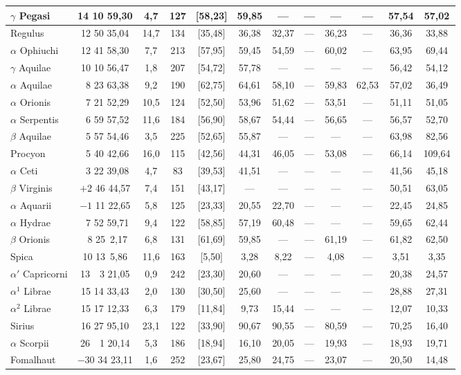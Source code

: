 \documentclass[12pt,a4paper]{article}
\theoremstyle{plain}
\theoremstyle{definition}
\theoremstyle{remark}
\begin{document}
{\begin{center}
\begin{tabular}{l|c c c | c c c c c c c c}
$\gamma$ Pegasi & 14 10 59,30 & 4,7 & 127 & [58,23] & 59,85 & --- & --- & --- & --- & 57,54 & 57,02 \\
\midrule
Regulus & 12 50 35,04 & 14,7 & 134 & [35,48] & 36,38 & 32,37 & --- & 36,23 & --- & 36,36 & 33,88 \\
$\alpha$ Ophiuchi & 12 41 58,30 & 7,7 & 213 & [57,95] & 59,45 & 54,59 & --- & 60,02 & --- & 63,95 & 69,44 \\
$\gamma$ Aquilae & 10 10 56,47 & 1,8 & 207 & [54,72] & 57,78 & --- & --- & --- & --- & 56,42 & 54,12 \\
$\alpha$ Aquilae & \ 8 23 63,38 & 9,2 & 190 & [62,75] & 64,61 & 58,10 & --- & 59,83 & 62,53 & 57,02 & 36,49 \\
$\alpha$ Orionis & \ 7 21 52,29 & 10,5 & 124 & [52,50] & 53,96 & 51,62 & --- & 53,51 & --- & 51,11 & 51,05 \\
\midrule
$\alpha$ Serpentis & \ 6 59 57,52 & 11,6 & 184 & [56,90] & 58,67 & 54,44 & --- & 56,65 & --- & 56,57 & 52,70 \\
$\beta$ Aquilae & \ 5 57 54,46 & 3,5 & 225 & [52,65] & 55,87 & --- & --- & --- & --- & 63,98 & 82,56 \\
Procyon & \ 5 40 42,66 & 16,0 & 115 & [42,56] & 44,31 & 46,05 & --- & 53,08 & --- & 66,14 & 109,64 \\
$\alpha$ Ceti & \ 3 22 39,08 & 4,7 & 83 & [39,53] & 41,51 & --- & --- & --- & --- & 41,56 & 45,18 \\
$\beta$ Virginis & $+2$ 46 44,57 & 7,4 & 151 & [43,17] & --- & --- & --- & --- & --- & 50,51 & 63,05 \\
\midrule
$\alpha$ Aquarii & $-1$ 11 22,65 & 5,8 & 125 & [23,33] & 20,55 & 22,70 & --- & --- & --- & 22,45 & 24,85 \\
$\alpha$ Hydrae & \ 7 52 59,71 & 9,4 & 122 & [58,85] & 57,19 & 60,48 & --- & --- & --- & 59,65 & 62,44 \\
$\beta$ Orionis & \ 8 25\quad\, 2,17 & 6,8 & 131 & [61,69] & 59,85 & --- & --- & 61,19 & --- & 61,82 & 62,50 \\
Spica & 10 13\quad\, 5,86 & 11,6 & 163 & [5,50] & 3,28 & 8,22 & --- & 4,08 & --- & 3,51 & 3,35 \\
$\alpha'$ Capricorni & 13\ \ 3 21,05 & 0,9 & 242 & [23,30] & 20,60 & --- & --- & --- & --- & 20,38 & 24,57 \\
\midrule
$\alpha^1$ Librae & 15 14 33,43 & 2,0 & 130 & [30,50] & 25,60 & --- & --- & --- & --- & 28,88 & 27,31 \\
$\alpha^2$ Librae & 15 17 12,33 & 6,3 & 179 & [11,84] & 9,73 & 15,44 & --- & --- & --- & 12,07 & 10,33 \\
Sirius & 16 27 95,10 & 23,1 & 122 & [33,90] & 90,67 & 90,55 & --- & 80,59 & --- & 70,25 & 16,40 \\
$\alpha$ Scorpii & 26\ \ 1 20,14 & 5,3 & 186 & [18,94] & 16,10 & 20,05 & --- & 19,93 & --- & 18,93 & 19,71 \\
Fomalhaut & $-30$ 34 23,11 & 1,6 & 252 & [23,67] & 25,80 & 24,75 & --- & 23,07 & --- & 20,50 & 14,48 \\
\bottomrule
\end{tabular}
\end{center}
}
\end{document}
